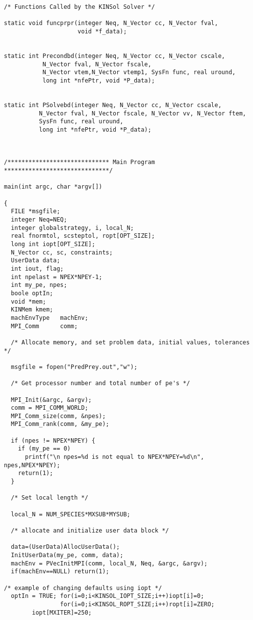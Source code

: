 \begin{verbatim}
/* Functions Called by the KINSol Solver */

static void funcprpr(integer Neq, N_Vector cc, N_Vector fval, 
                     void *f_data);


static int Precondbd(integer Neq, N_Vector cc, N_Vector cscale,
		   N_Vector fval, N_Vector fscale,
		   N_Vector vtem,N_Vector vtemp1, SysFn func, real uround,
		   long int *nfePtr, void *P_data);


static int PSolvebd(integer Neq, N_Vector cc, N_Vector cscale,
		  N_Vector fval, N_Vector fscale, N_Vector vv, N_Vector ftem,
		  SysFn func, real uround, 
		  long int *nfePtr, void *P_data);



/***************************** Main Program ******************************/

main(int argc, char *argv[])

{
  FILE *msgfile;
  integer Neq=NEQ;
  integer globalstrategy, i, local_N;
  real fnormtol, scsteptol, ropt[OPT_SIZE];
  long int iopt[OPT_SIZE];
  N_Vector cc, sc, constraints;
  UserData data;
  int iout, flag;
  int npelast = NPEX*NPEY-1;
  int my_pe, npes;
  boole optIn;
  void *mem;
  KINMem kmem;
  machEnvType   machEnv;
  MPI_Comm      comm;

  /* Allocate memory, and set problem data, initial values, tolerances */ 

  msgfile = fopen("PredPrey.out","w");

  /* Get processor number and total number of pe's */

  MPI_Init(&argc, &argv);
  comm = MPI_COMM_WORLD;
  MPI_Comm_size(comm, &npes);
  MPI_Comm_rank(comm, &my_pe);

  if (npes != NPEX*NPEY) {
    if (my_pe == 0)
      printf("\n npes=%d is not equal to NPEX*NPEY=%d\n", npes,NPEX*NPEY);
    return(1);
  }

  /* Set local length */

  local_N = NUM_SPECIES*MXSUB*MYSUB;

  /* allocate and initialize user data block */

  data=(UserData)AllocUserData();
  InitUserData(my_pe, comm, data);
  machEnv = PVecInitMPI(comm, local_N, Neq, &argc, &argv);
  if(machEnv==NULL) return(1);

/* example of changing defaults using iopt */
  optIn = TRUE; for(i=0;i<KINSOL_IOPT_SIZE;i++)iopt[i]=0; 
                for(i=0;i<KINSOL_ROPT_SIZE;i++)ropt[i]=ZERO;
		iopt[MXITER]=250; 


\end{verbatim}
